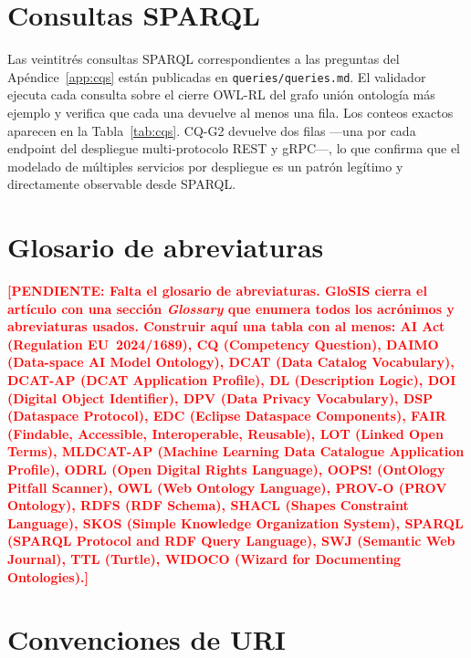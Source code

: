 \documentclass[Afour,sagev,times]{sagej}
\newcommand{\code}[1]{\texttt{#1}}
\newcommand{\TODO}[1]{\textcolor{red}{\textbf{[PENDIENTE: #1]}}}
\begin{document}
\section{Consultas SPARQL}\label{app:sparql}

Las veintitrés consultas SPARQL correspondientes a las preguntas del Apéndice~\ref{app:cqs} están publicadas en \code{queries/queries.md}. El validador ejecuta cada consulta sobre el cierre OWL-RL del grafo unión ontología más ejemplo y verifica que cada una devuelve al menos una fila. Los conteos exactos aparecen en la Tabla~\ref{tab:cqs}. CQ-G2 devuelve dos filas ---una por cada endpoint del despliegue multi-protocolo REST y gRPC---, lo que confirma que el modelado de múltiples servicios por despliegue es un patrón legítimo y directamente observable desde SPARQL.

\section{Glosario de abreviaturas}\label{app:glossary}

\TODO{Falta el glosario de abreviaturas. GloSIS cierra el artículo con una sección \emph{Glossary} que enumera todos los acrónimos y abreviaturas usados. Construir aquí una tabla con al menos: \textbf{AI Act} (Regulation EU~2024/1689), \textbf{CQ} (Competency Question), \textbf{DAIMO} (Data-space AI Model Ontology), \textbf{DCAT} (Data Catalog Vocabulary), \textbf{DCAT-AP} (DCAT Application Profile), \textbf{DL} (Description Logic), \textbf{DOI} (Digital Object Identifier), \textbf{DPV} (Data Privacy Vocabulary), \textbf{DSP} (Dataspace Protocol), \textbf{EDC} (Eclipse Dataspace Components), \textbf{FAIR} (Findable, Accessible, Interoperable, Reusable), \textbf{LOT} (Linked Open Terms), \textbf{MLDCAT-AP} (Machine Learning Data Catalogue Application Profile), \textbf{ODRL} (Open Digital Rights Language), \textbf{OOPS!} (OntOlogy Pitfall Scanner), \textbf{OWL} (Web Ontology Language), \textbf{PROV-O} (PROV Ontology), \textbf{RDFS} (RDF Schema), \textbf{SHACL} (Shapes Constraint Language), \textbf{SKOS} (Simple Knowledge Organization System), \textbf{SPARQL} (SPARQL Protocol and RDF Query Language), \textbf{SWJ} (Semantic Web Journal), \textbf{TTL} (Turtle), \textbf{WIDOCO} (Wizard for Documenting Ontologies).}

\section{Convenciones de URI}\label{app:uris}
\end{document}
